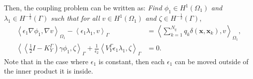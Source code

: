 Then, the coupling problem can be written as: \textit{Find $ \phi_1 \in H^1(\Omega_1)$ and $\lambda_1 \in H^{-\frac{1}{2}}(\Gamma)$ such that for all $v \in H^1(\Omega_1)$ and $\zeta \in H^{-\frac{1}{2}}(\Gamma)$},
\begin{subequations}
\label{eq:standard_fem_bem}
\begin{align} 
 \left\langle  \epsilon_1 \nabla \phi_1, \nabla v \right\rangle_{\Omega_1}  - \left\langle \epsilon_1 \lambda_1, v \right\rangle_\Gamma &=   \left\langle  \sum_{k=1}^{N_q} q_k\delta(\mathbf{x},\mathbf{x}_k),  v \right\rangle_{\Omega_1}, \\[3mm] 
  \left\langle \left\langle\tfrac{1}{2} I - K_{Y}^{\Gamma}\right) \gamma \phi_1, \zeta \right\rangle_\Gamma + \tfrac{1}{\epsilon_2} \left\langle V_{Y}^{\Gamma}\epsilon_1\lambda_1, \zeta \right\rangle_\Gamma &=0.
\end{align}
\end{subequations}
Note that in the case where $\epsilon_1$ is constant, then each $\epsilon_1$ can be moved outside of the inner product it is inside.



